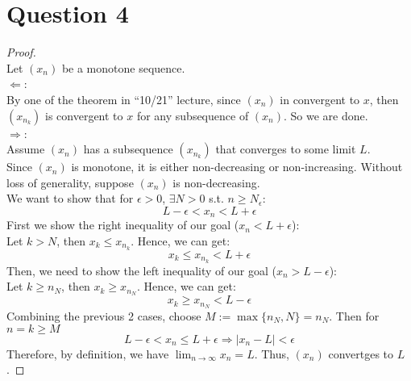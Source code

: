 \documentclass{article}
\begin{document}
\section*{Question 4}
\begin{proof}
    \hspace{0.001cm}
    \\
    Let $(x_n)$ be a monotone sequence.
    \\
    $\Leftarrow$: 
    \\
    By one of the theorem in ``10/21'' lecture, since $(x_n)$ in convergent to $x$, then $(x_{n_k})$ is convergent to $x$ for any subsequence of $(x_n)$.
    So we are done.
    \\
    $\Rightarrow$:
    \\
    Assume $(x_n)$ has a subsequence $(x_{n_k})$ that converges to some limit $L$.
    \\
    Since $(x_n)$ is monotone, it is either non-decreasing or non-increasing. Without loss of generality, suppose $(x_n)$ is non-decreasing.
    \\
    We want to show that for $\epsilon > 0$, $\exists N > 0$ s.t. $n \geq N_{\epsilon}$:
    \[ L - \epsilon < x_n < L + \epsilon \]
    First we show the right inequality of our goal ($x_n < L + \epsilon$): 
    \\
    Let $k > N$, then $x_k \leq x_{n_k}$. Hence, we can get:
    \[ x_k \leq x_{n_k} < L + \epsilon \]
    Then, we need to show the left inequality of our goal ($x_n > L - \epsilon$):
    \\
    Let $k \geq n_N$, then $x_k \geq x_{n_N}$. Hence, we can get:
    \[ x_k \geq x_{n_N} < L - \epsilon \]
    Combining the previous 2 cases, choose $M := \max\{n_N, N\} = n_N$. Then for $n=k \geq M$
    \[ L - \epsilon < x_n \leq L + \epsilon \Longrightarrow |x_n - L| < \epsilon \]
    Therefore, by definition, we have $\lim_{n \rightarrow \infty} x_n = L$. Thus, $(x_n)$ convertges to $L$.
\end{proof}
\end{document}

